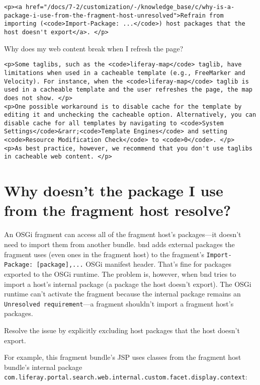 \begin{verbatim}
<p><a href="/docs/7-2/customization/-/knowledge_base/c/why-is-a-package-i-use-from-the-fragment-host-unresolved">Refrain from importing (<code>Import-Package: ...</code>) host packages that the host doesn't export</a>. </p>
\end{verbatim}

\label{cacheable-web-content-taglibs}
{Why does my web content break when I refresh the page?~{}}

\begin{verbatim}
<p>Some taglibs, such as the <code>liferay-map</code> taglib, have limitations when used in a cacheable template (e.g., FreeMarker and Velocity). For instance, when the <code>liferay-map</code> taglib is used in a cacheable template and the user refreshes the page, the map does not show. </p>
<p>One possible workaround is to disable cache for the template by editing it and unchecking the cacheable option. Alternatively, you can disable cache for all templates by navigating to <code>System Settings</code>&rarr;<code>Template Engines</code> and setting <code>Resource Modification Check</code> to <code>0</code>. </p>
<p>As best practice, however, we recommend that you don't use taglibs in cacheable web content. </p>
\end{verbatim}

\chapter{Why doesn't the package I use from the fragment host
resolve?}\label{why-doesnt-the-package-i-use-from-the-fragment-host-resolve}

An OSGi fragment can access all of the fragment host's packages---it
doesn't need to import them from another bundle. bnd adds external
packages the fragment uses (even ones in the fragment host) to the
fragment's \texttt{Import-Package:\ {[}package{]},...} OSGi manifest
header. That's fine for packages exported to the OSGi runtime. The
problem is, however, when bnd tries to import a host's internal package
(a package the host doesn't export). The OSGi runtime can't activate the
fragment because the internal package remains an
\texttt{Unresolved\ requirement}---a fragment shouldn't import a
fragment host's packages.

Resolve the issue by explicitly excluding host packages that the host
doesn't export.

For example, this fragment bundle's JSP uses classes from the fragment
host bundle's internal package
\texttt{com.liferay.portal.search.web.internal.custom.facet.display.context}:

